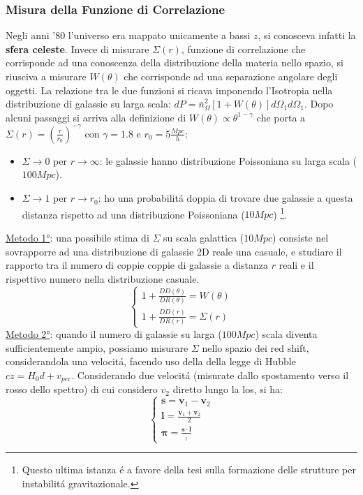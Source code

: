 \documentclass[12pt, a4paper]{article}
\begin{document}
\subsubsection{Misura della Funzione di Correlazione}
Negli anni '80 l'universo era mappato unicamente a bassi $z$, si conosceva infatti la \textbf{sfera celeste}. Invece di misurare $\Sigma(r)$, funzione di correlazione che corrisponde ad una conoscenza della distribuzione della materia nello spazio, si riusciva a misurare $W(\theta)$ che corrisponde ad una separazione angolare degli oggetti. La relazione tra le due funzioni si ricava imponendo l'Isotropia nella distribuzione di galassie su larga scala: $dP=\bar{n}_{\Omega}^2 [1+W(\theta)] d\Omega_1 d\Omega_1$. Dopo alcuni passaggi si arriva alla definizione di $W(\theta)\propto \theta^{1-\gamma}$ che porta a $\Sigma(r)=(\frac{r}{r_0})^{-\gamma}$ con $\gamma=1.8$ e $r_0=5 \frac{Mpc}{h}$:
\begin{itemize}
\item $\Sigma \rightarrow 0$ per $r\rightarrow \infty$: le galassie hanno distribuzione Poissoniana su larga scala ($100Mpc$).
\item $\Sigma \rightarrow 1$ per $r\rightarrow r_0$: ho una probabilit\'{a} doppia di trovare due galassie a questa distanza rispetto ad una distribuzione Poissoniana ($10Mpc$) \footnote{Questo ultima istanza \'{e} a favore della tesi sulla formazione delle strutture per instabilit\'{a} gravitazionale.}.
\end{itemize}
\underline{Metodo 1°}: una possibile stima di $\Sigma$ su scala galattica ($10Mpc$) consiste nel sovrapporre ad una distribuzione di galassie 2D reale una casuale, e studiare il rapporto tra il numero di coppie coppie di galassie a distanza $r$ reali e il rispettivo numero nella distribuzione casuale.
\begin{equation}
\begin{cases}
1+\frac{DD(\theta)}{DR(\theta)}=W(\theta)
\\
1+\frac{DD(r)}{DR(r)}=\Sigma(r)
\end{cases}
\end{equation}
\underline{Metodo 2°}: quando il numero di galassie su larga ($100Mpc$) scala diventa sufficientemente ampio, possiamo misurare $\Sigma$ nello spazio dei red shift, considerandola una velocit\'{a}, facendo uso della della legge di Hubble $cz=H_0d+v_{pec}$. Considerando due velocit\'{a} (misurate dallo spostamento verso il rosso dello spettro) di cui considero $v_2$ diretto lungo la los, si ha:
\begin{equation}
\begin{cases}
\mathbf{s}=\mathbf{v}_1-\mathbf{v}_2
\\
\mathbf{l}=\frac{\mathbf{v}_1+\mathbf{v}_2}{2}
\\
\mathbf{\pi}=\frac{\mathbf{s}\cdot\mathbf{l}}{_l}
\end{cases}
\end{equation}
\end{document}
